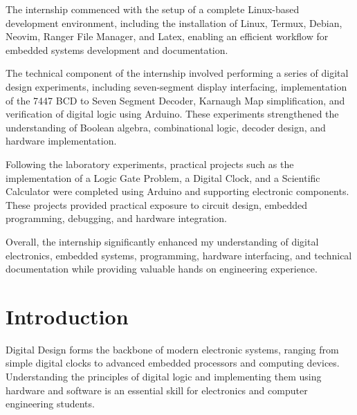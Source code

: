 \documentclass[12pt,a4paper]{report}
\begin{document}
The internship commenced with the setup of a complete Linux-based development environment, including the installation of Linux, Termux, Debian, Neovim, Ranger File Manager, and Latex, enabling an efficient workflow for embedded systems development and documentation.

The technical component of the internship involved performing a series of digital design experiments, including seven-segment display interfacing, implementation of the 7447 BCD to Seven Segment Decoder, Karnaugh Map simplification, and verification of digital logic using Arduino. These experiments strengthened the understanding of Boolean algebra, combinational logic, decoder design, and hardware implementation.

Following the laboratory experiments, practical projects such as the implementation of a Logic Gate Problem, a Digital Clock, and a Scientific Calculator were completed using Arduino and supporting electronic components. These projects provided practical exposure to circuit design, embedded programming, debugging, and hardware integration.

Overall, the internship significantly enhanced my understanding of digital electronics, embedded systems, programming, hardware interfacing, and technical documentation while providing valuable hands on engineering experience.


\tableofcontents

\clearpage



\chapter{Introduction}
Digital Design forms the backbone of modern electronic systems, ranging from simple digital clocks to advanced embedded processors and computing devices. Understanding the principles of digital logic and implementing them using hardware and software is an essential skill for electronics and computer engineering students.
\end{document}
